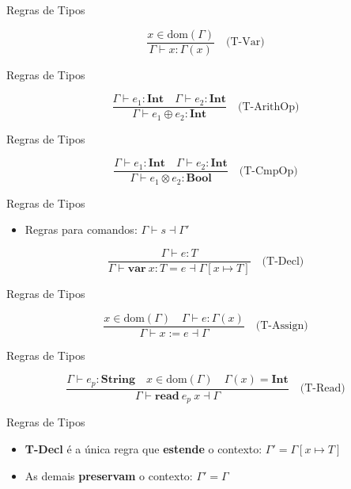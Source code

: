 \begin{frame}{Regras de Tipos}

    \[
    \frac{x \in \mathrm{dom}(\Gamma)}{\Gamma \vdash x : \Gamma(x)} \quad\text{(T-Var)}\]
\end{frame}

\begin{frame}{Regras de Tipos}

    \[\frac{\Gamma \vdash e_1 : \mathbf{Int} \quad \Gamma \vdash e_2 : \mathbf{Int}}{\Gamma \vdash e_1 \oplus e_2 : \mathbf{Int}} \quad\text{(T-ArithOp)}
    \]
\end{frame}

\begin{frame}{Regras de Tipos}

    \[
    \frac{\Gamma \vdash e_1 : \mathbf{Int} \quad \Gamma \vdash e_2 : \mathbf{Int}}{\Gamma \vdash e_1 \otimes e_2 : \mathbf{Bool}} \quad\text{(T-CmpOp)}\]
\end{frame}

\begin{frame}{Regras de Tipos}

    \begin{itemize}

        \item
        Regras para comandos: \(\Gamma \vdash s \dashv \Gamma'\)
    \end{itemize}

    \[\frac{\Gamma \vdash e : T}{\Gamma \vdash \mathbf{var}\ x : T = e \dashv \Gamma[x \mapsto T]} \quad\text{(T-Decl)}\]
\end{frame}

\begin{frame}{Regras de Tipos}

    \[\frac{x \in \mathrm{dom}(\Gamma) \quad \Gamma \vdash e : \Gamma(x)}{\Gamma \vdash x \mathbin{:=} e \dashv \Gamma} \quad\text{(T-Assign)}\]
\end{frame}

\begin{frame}{Regras de Tipos}

    \[\frac{\Gamma \vdash e_p : \mathbf{String} \quad x \in \mathrm{dom}(\Gamma) \quad \Gamma(x) = \mathbf{Int}}{\Gamma \vdash \mathbf{read}\ e_p\ x \dashv \Gamma} \quad\text{(T-Read)}\]
\end{frame}

\begin{frame}{Regras de Tipos}

    \begin{itemize}

        \item
        \textbf{T-Decl} é a única regra que \textbf{estende} o contexto:
        \(\Gamma' = \Gamma[x \mapsto T]\)
        \item
        As demais \textbf{preservam} o contexto: \(\Gamma' = \Gamma\)
    \end{itemize}
\end{frame}


